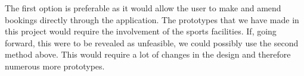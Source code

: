 The first option is preferable as it would allow the user to make and amend
bookings directly through the application. The prototypes that we have made in
this project would require the involvement of the sports facilities. If, going
forward, this were to be revealed as unfeasible, we could possibly use the
second method above. This would require a lot of changes in the design and
therefore numerous more prototypes.
